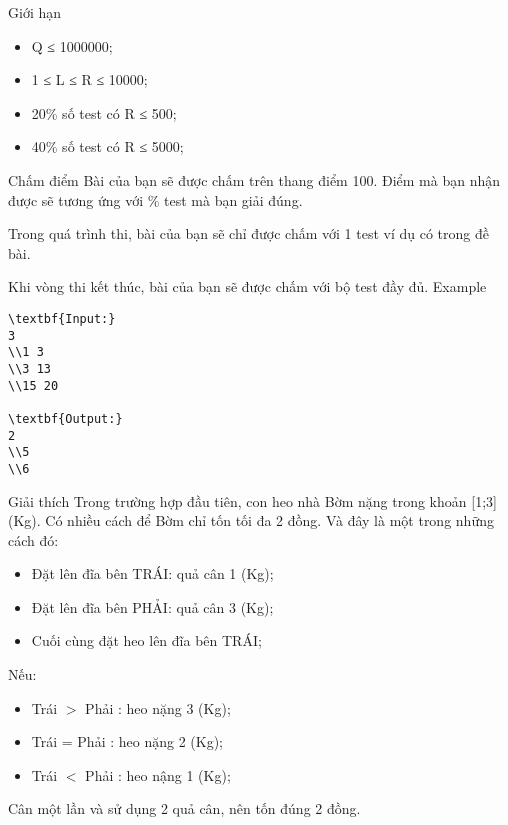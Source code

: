 Giới hạn
\begin{itemize}
	\item     Q ≤ 1000000;   
	\item     1 ≤ L ≤ R ≤ 10000;   
	\item     20\% số test có R ≤ 500;   
	\item     40\% số test có R ≤ 5000;   
\end{itemize}
Chấm điểm
Bài của bạn sẽ được chấm trên thang điểm 100. Điểm mà bạn nhận được sẽ tương ứng với \% test mà bạn giải đúng.  

   Trong quá trình thi, bài của bạn sẽ chỉ được chấm với 1 test ví dụ có trong đề bài.  

   Khi vòng thi kết thúc, bài của bạn sẽ được chấm với bộ test đầy đủ.
Example
\begin{verbatim}
\textbf{Input:}
3
\\1 3
\\3 13
\\15 20

\textbf{Output:}
2
\\5
\\6\end{verbatim}
Giải thích
Trong trường hợp đầu tiên, con heo nhà Bờm nặng trong khoản [1;3] (Kg). Có nhiều cách để Bờm chỉ tốn tối đa 2 đồng. Và đây là một trong những cách đó:  
\begin{itemize}
	\item     Đặt lên đĩa bên TRÁI: quả cân 1 (Kg);   
	\item     Đặt lên đĩa bên PHẢI: quả cân 3 (Kg);   
	\item     Cuối cùng đặt heo lên đĩa bên TRÁI;   
\end{itemize}

   Nếu:  
\begin{itemize}
	\item     Trái $>$ Phải : heo nặng 3 (Kg);   
	\item     Trái = Phải : heo nặng 2 (Kg);   
	\item     Trái $<$ Phải : heo nậng 1 (Kg);   
\end{itemize}
\begin{itemize}
\end{itemize}

   Cân một lần và sử dụng 2 quả cân, nên tốn đúng 2 đồng.